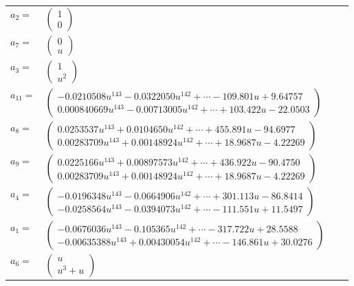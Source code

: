 \documentclass[1p]{elsarticle_modified}
\theoremstyle{definition}
\begin{document}
\begin{tabular}{m{7pt} m{180pt} m{7pt} m{180pt} }
\flushright $a_{2}=$&$\begin{pmatrix}1\\0\end{pmatrix}$ \\
\flushright $a_{7}=$&$\begin{pmatrix}0\\u\end{pmatrix}$ \\
\flushright $a_{3}=$&$\begin{pmatrix}1\\u^2\end{pmatrix}$ \\
\flushright $a_{11}=$&$\begin{pmatrix}-0.0210508 u^{143}-0.0322050 u^{142}+\cdots-109.801 u+9.64757\\0.000840669 u^{143}-0.00713005 u^{142}+\cdots+103.422 u-22.0503\end{pmatrix}$ \\
\flushright $a_{8}=$&$\begin{pmatrix}0.0253537 u^{143}+0.0104650 u^{142}+\cdots+455.891 u-94.6977\\0.00283709 u^{143}+0.00148924 u^{142}+\cdots+18.9687 u-4.22269\end{pmatrix}$ \\
\flushright $a_{9}=$&$\begin{pmatrix}0.0225166 u^{143}+0.00897573 u^{142}+\cdots+436.922 u-90.4750\\0.00283709 u^{143}+0.00148924 u^{142}+\cdots+18.9687 u-4.22269\end{pmatrix}$ \\
\flushright $a_{4}=$&$\begin{pmatrix}-0.0196348 u^{143}-0.0664906 u^{142}+\cdots+301.113 u-86.8414\\-0.0258564 u^{143}-0.0394073 u^{142}+\cdots-111.551 u+11.5497\end{pmatrix}$ \\
\flushright $a_{1}=$&$\begin{pmatrix}-0.0676036 u^{143}-0.105365 u^{142}+\cdots-317.722 u+28.5588\\-0.00635388 u^{143}+0.00430054 u^{142}+\cdots-146.861 u+30.0276\end{pmatrix}$ \\
\flushright $a_{6}=$&$\begin{pmatrix}u\\u^3+u\end{pmatrix}$ \\

\end{tabular}
\end{document}
